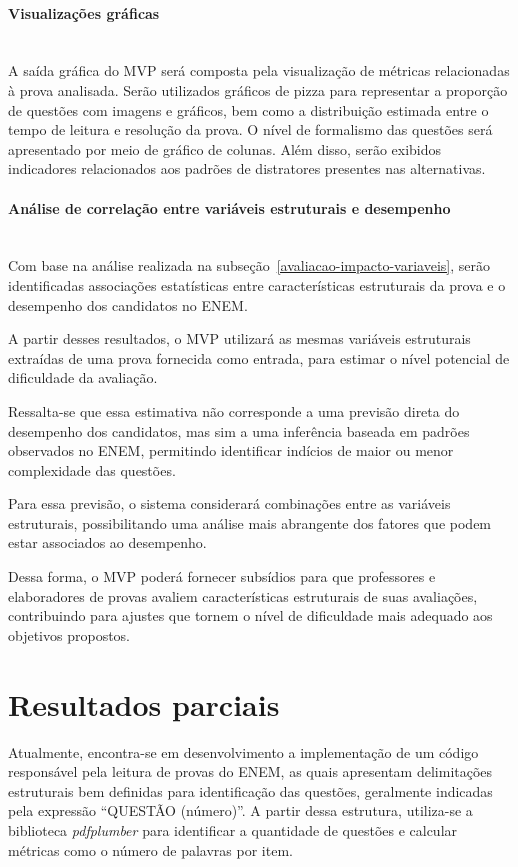 \documentclass[a4paper,10pt, twocolumn]{article}
\begin{document}
\paragraph{Visualizações gráficas}
\mbox{}\\

A saída gráfica do MVP será composta pela visualização de métricas relacionadas à prova analisada. Serão utilizados gráficos de pizza para representar a proporção de questões com imagens e gráficos, bem como a distribuição estimada entre o tempo de leitura e resolução da prova. O nível de formalismo das questões será apresentado por meio de gráfico de colunas. Além disso, serão exibidos indicadores relacionados aos padrões de distratores presentes nas alternativas.

\paragraph{Análise de correlação entre variáveis estruturais e desempenho}
\mbox{}\\

Com base na análise realizada na subseção~\ref{avaliacao-impacto-variaveis}, serão identificadas associações estatísticas entre características estruturais da prova e o desempenho dos candidatos no ENEM.

A partir desses resultados, o MVP utilizará as mesmas variáveis estruturais extraídas de uma prova fornecida como entrada, para estimar o nível potencial de dificuldade da avaliação.

Ressalta-se que essa estimativa não corresponde a uma previsão direta do desempenho dos candidatos, mas sim a uma inferência baseada em padrões observados no ENEM, permitindo identificar indícios de maior ou menor complexidade das questões.

Para essa previsão, o sistema considerará combinações entre as variáveis estruturais, possibilitando uma análise mais abrangente dos fatores que podem estar associados ao desempenho.

Dessa forma, o MVP poderá fornecer subsídios para que professores e elaboradores de provas avaliem características estruturais de suas avaliações, contribuindo para ajustes que tornem o nível de dificuldade mais adequado aos objetivos propostos.
\section{Resultados parciais} 
Atualmente, encontra-se em desenvolvimento a implementação de um código responsável pela leitura de provas do ENEM, as quais apresentam delimitações estruturais bem definidas para identificação das questões, geralmente indicadas pela expressão “QUESTÃO (número)”. A partir dessa estrutura, utiliza-se a biblioteca \textit{pdfplumber} para identificar a quantidade de questões e calcular métricas como o número de palavras por item.
\end{document}
